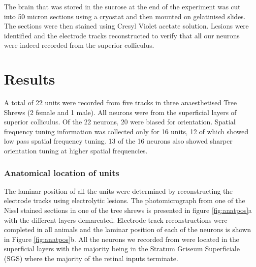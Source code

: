 	The brain that was stored in the sucrose at the end of the experiment was cut into 50 micron sections using a cryostat and then mounted on gelatinised slides. The sections were then stained using Cresyl Violet acetate solution. Lesions were identified and the electrode tracks reconstructed to verify that all our neurons were indeed recorded from the superior colliculus.
	
	\section{Results}
	
	A total of 22 units were recorded from five tracks in three anaesthetised Tree Shrews (2 female and 1 male). All neurons were from the superficial layers of superior colliculus. Of the 22 neurons, 20 were biased for orientation. Spatial frequency tuning information was collected only for 16 units, 12 of which showed low pass spatial frequency tuning. 13 of the 16 neurons also showed sharper orientation tuning at higher spatial frequencies.
	
	
	\subsubsection{Anatomical location of units}
	
		The laminar position of all the units were determined by reconstructing the electrode tracks using electrolytic lesions. The photomicrograph from one of the Nissl stained sections in one of the tree shrews is presented in figure \ref{fig:anatpos}a with the different layers demarcated. Electrode track reconstructions were completed in all animals and the laminar position of each of the neurons is shown in Figure \ref{fig:anatpos}b. All the neurons we recorded from were located in the superficial layers with the majority being in the Stratum Griseum Superficiale (SGS) where the majority of the retinal inputs terminate.
		
